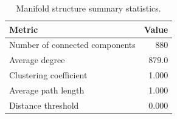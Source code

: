 \begin{table}
\caption{Manifold structure summary statistics.}
\label{tab:manifold}
\begin{tabular}{lr}
\toprule
Metric & Value \\
\midrule
Number of connected components & 880 \\
Average degree & 879.0 \\
Clustering coefficient & 1.000 \\
Average path length & 1.000 \\
Distance threshold & 0.000 \\
\bottomrule
\end{tabular}
\end{table}

